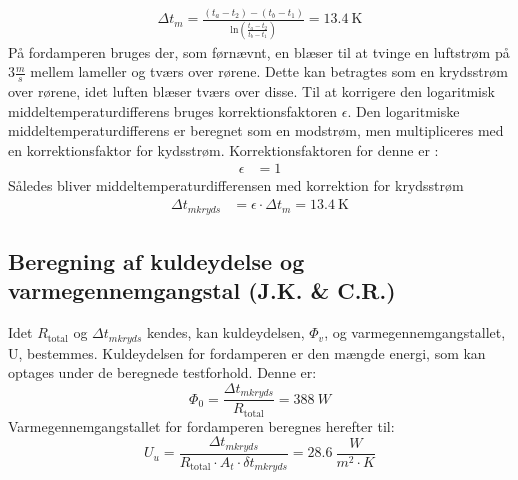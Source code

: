 \documentclass[../Hovedrapport.tex]{subfiles}
\begin{document}
\begin{align}
\Delta t_{m} = \frac{(t_{a}-t_{2})-(t_{b}-t_{1})}{\text{ln}{ \left( \frac{t_{a}-t_{2}}{t_{b}-t_{1}} \right) }} = \SI{13,4}{\kelvin}
\end{align}
På fordamperen bruges der, som førnævnt, en blæser til at tvinge en luftstrøm på $3 \frac{m}{s}$ mellem lameller og tværs over rørene. Dette kan betragtes som en krydsstrøm over rørene, idet luften blæser tværs over disse. Til at korrigere den logaritmisk middeltemperaturdifferens bruges korrektionsfaktoren $\epsilon$. 
Den logaritmiske middeltemperaturdifferens er beregnet som en modstrøm, men multipliceres med en korrektionsfaktor for kydsstrøm. Korrektionsfaktoren for denne er \citep{koleteknik}:
\begin{align}
    \epsilon &= 1   
\end{align}
Således bliver middeltemperaturdifferensen med korrektion for krydsstrøm
\begin{align}
   \Delta{t_{mkryds}} &= \si{\epsilon}\cdot\si{\Delta{t_m}} = \SI{13,4}{\kelvin}
\end{align}

\subsection{Beregning af kuldeydelse og varmegennemgangstal  (J.K. \& C.R.)}
Idet $R_\text{total}$ og $\Delta t_{mkryds}$ kendes, kan kuldeydelsen, $\Phi_v$, og varmegennemgangstallet, U, bestemmes. Kuldeydelsen for fordamperen er den mængde energi, som kan optages under de beregnede testforhold. Denne er:
\begin{equation}
\Phi_{0} = \frac {{\Delta t}_{mkryds}}{R_\text{total}} = \SI{388}{W}
\end{equation}
Varmegennemgangstallet for fordamperen beregnes herefter til:
\begin{equation}
U_u = \frac {{\Delta t}_{mkryds}}{R_\text{total} \cdot  A_{t} \cdot  {\delta t}_{mkryds}} = \SI{28,6}{\frac{W}{m^2 \cdot K}}
\end{equation}
\end{document}
